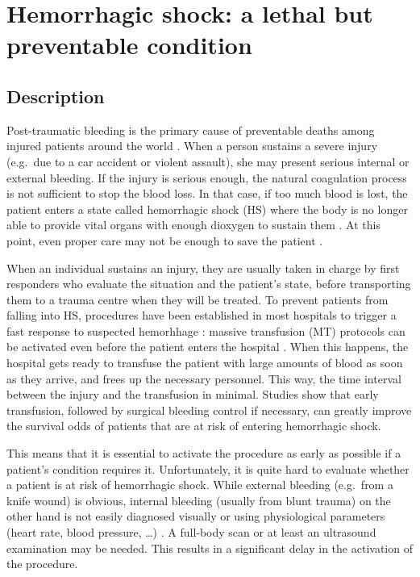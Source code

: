 	\section{Hemorrhagic shock: a lethal but preventable condition}
	\label{shock}
		\subsection{Description}
Post-traumatic bleeding is the primary cause of preventable deaths among injured patients around the world \cite{WHO}\cite{urban}. When a person sustains a severe injury (e.g.\ due to a car accident or violent assault), she may present serious internal or external bleeding. If the injury is serious enough, the natural coagulation process is not sufficient to stop the blood loss. In that case, if too much blood is lost, the patient enters a state called hemorrhagic shock (HS) where the body is no longer able to provide vital organs with enough dioxygen to sustain them \cite{HS_def}. At this point, even proper care may not be enough to save the patient \cite{dutton2007current}.

When an individual sustains an injury, they are usually taken in charge by first responders who evaluate the situation and the patient's state, before transporting them to a trauma centre when they will be treated.
To prevent patients from falling into HS, procedures have been established in most hospitals to trigger a fast response to suspected hemorhhage \cite{pommerening2015gestalt}: massive transfusion (MT) protocols can be activated even before the patient enters the hospital \cite{malone2006MT}. When this happens, the hospital gets ready to transfuse the patient with large amounts of blood as soon as they arrive, and frees up the necessary personnel. This way, the time interval between the injury and the transfusion in minimal. Studies \cite{hoyt1994death} \cite{martin2009combatSupport} show that early transfusion, followed by surgical bleeding control if necessary, can greatly improve the survival odds of patients that are at risk of entering hemorrhagic shock.

This means that it is essential to activate the procedure as early as possible if a patient's condition requires it. Unfortunately, it is quite hard to evaluate whether a patient is at risk of hemorrhagic shock\cite{pommerening2015gestalt}. While external bleeding (e.g.\ from a knife wound) is obvious, internal bleeding (usually from blunt trauma) on the other hand is not easily diagnosed visually or using physiological parameters (heart rate, blood pressure, \ldots) \cite{frank2010bloodLoss}. A full-body scan or at least an ultrasound examination may be needed\cite{perera2010rush}. This results in a significant delay in the activation of the procedure.

